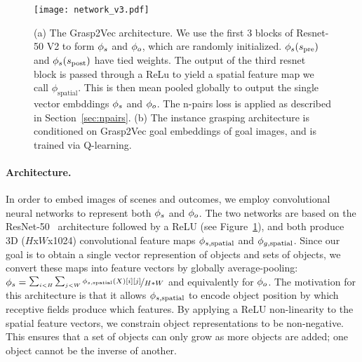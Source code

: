 \documentclass{article}
\begin{document}
\begin{figure}
\vspace{-0.05in}
\texttt{[image: network\_v3.pdf]}
\caption{(a) The Grasp2Vec architecture. We use the first 3 blocks of Resnet-50 V2 to form $\phi_s$ and $\phi_o$, which are randomly initialized. $\phi_s(s_\text{pre})$ and $\phi_s(s_\text{post})$ have tied weights. The output of the third resnet block is passed through a ReLu to yield a spatial feature map we call $\phi_\text{spatial}$. This is then mean pooled globally to output the single vector embddings $\phi_s$ and $\phi_o$. The n-pairs loss is applied as described in Section~\ref{sec:npairs}. (b) The instance grasping architecture is conditioned on Grasp2Vec goal embeddings of goal images, and is trained via Q-learning.}
\label{fig:grasp2vec}
\vspace{-0.2in}
\end{figure}
\vspace{-0.1in}
\paragraph{Architecture.}
In order to embed images of scenes and outcomes, we employ convolutional neural networks to represent both $\phi_s$ and $\phi_o$. The two networks are based on the ResNet-50~\cite{he2016deep} architecture followed by a ReLU (see Figure~\ref{fig:grasp2vec}), and both produce 3D ($H$x$W$x1024) convolutional feature maps  $\phi_{s,\text{spatial}}$ and $\phi_{g,\text{spatial}}$. Since our goal is to obtain a single vector represention of objects and sets of objects, we convert these maps into feature vectors by globally average-pooling: $\phi_s = \nicefrac{\sum_{i<H}\sum_{j<W}\phi_{s,\text{spatial}}(X)[i][j]}{H*W}$ and equivalently for $\phi_o$. The motivation for this architecture is that it allows $\phi_{s,\text{spatial}}$ to encode object position by which receptive fields produce which features. By applying a ReLU non-linearity to the spatial feature vectors, we constrain object representations to be non-negative. This ensures that a set of objects can only grow as more objects are added; one object cannot be the inverse of another.

\vspace{-0.1in}
\end{document}
